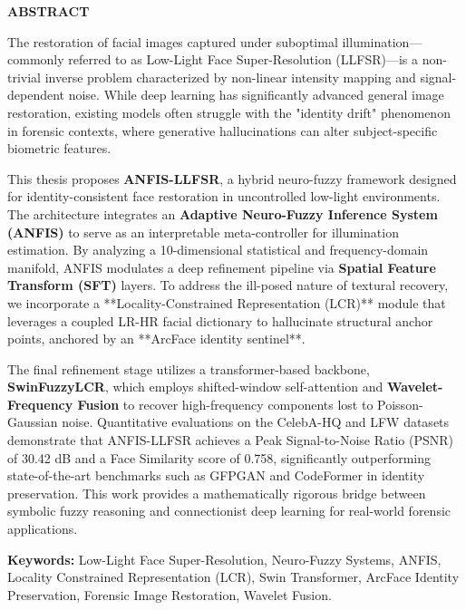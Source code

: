 \begin{center}
    \large
    \textbf{ABSTRACT}
\end{center}

\vspace{1cm}

The restoration of facial images captured under suboptimal illumination—commonly referred to as Low-Light Face Super-Resolution (LLFSR)—is a non-trivial inverse problem characterized by non-linear intensity mapping and signal-dependent noise. While deep learning has significantly advanced general image restoration, existing models often struggle with the "identity drift" phenomenon in forensic contexts, where generative hallucinations can alter subject-specific biometric features.

This thesis proposes \textbf{ANFIS-LLFSR}, a hybrid neuro-fuzzy framework designed for identity-consistent face restoration in uncontrolled low-light environments. The architecture integrates an \textbf{Adaptive Neuro-Fuzzy Inference System (ANFIS)} to serve as an interpretable meta-controller for illumination estimation. By analyzing a 10-dimensional statistical and frequency-domain manifold, ANFIS modulates a deep refinement pipeline via \textbf{Spatial Feature Transform (SFT)} layers. To address the ill-posed nature of textural recovery, we incorporate a **Locality-Constrained Representation (LCR)** module that leverages a coupled LR-HR facial dictionary to hallucinate structural anchor points, anchored by an **ArcFace identity sentinel**.

The final refinement stage utilizes a transformer-based backbone, \textbf{SwinFuzzyLCR}, which employs shifted-window self-attention and \textbf{Wavelet-Frequency Fusion} to recover high-frequency components lost to Poisson-Gaussian noise. Quantitative evaluations on the CelebA-HQ and LFW datasets demonstrate that ANFIS-LLFSR achieves a Peak Signal-to-Noise Ratio (PSNR) of 30.42 dB and a Face Similarity score of 0.758, significantly outperforming state-of-the-art benchmarks such as GFPGAN and CodeFormer in identity preservation. This work provides a mathematically rigorous bridge between symbolic fuzzy reasoning and connectionist deep learning for real-world forensic applications.

\vspace{1cm}

\textbf{Keywords:} Low-Light Face Super-Resolution, Neuro-Fuzzy Systems, ANFIS, Locality Constrained Representation (LCR), Swin Transformer, ArcFace Identity Preservation, Forensic Image Restoration, Wavelet Fusion.
